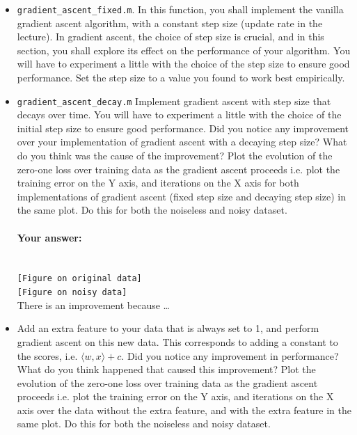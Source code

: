 \documentclass[english]{article}
\begin{document}
\begin{itemize}
\item {\tt gradient\_ascent\_fixed.m}. In this function, you shall implement the vanilla gradient ascent algorithm, with a constant step size (update rate in the lecture). In gradient ascent, the choice of step size is crucial, and in this section, you shall explore its effect on the performance of your algorithm. You will have to experiment a little with the choice of the step size to ensure good performance. Set the step size to a value you found to work best empirically. 

\item {\tt gradient\_ascent\_decay.m} Implement gradient ascent with step size that decays over time. You will have to experiment a little with the choice of the initial step size to ensure good performance. Did you notice any improvement over your implementation of gradient ascent with a decaying step size? What do you think was the cause of the improvement? Plot the evolution of the zero-one loss over training data as the gradient ascent proceeds i.e. plot the training error on the Y axis, and iterations on the X axis for both implementations of gradient ascent (fixed step size and decaying step size) in the same plot. Do this for both the noiseless and noisy dataset.

\paragraph{Your answer:}
 ~\\
 
 {\tt  [Figure on original data]}
 \\    
 
 {\tt [Figure on noisy data]}
 \\
  
  There is an improvement because \ldots  
  \\

\item Add an extra feature to your data that is always set to 1, and perform gradient ascent on this new data. This corresponds to adding a constant to the scores, i.e. $\langle w,x\rangle + c$. Did you notice any improvement in performance? What do you think happened that caused this improvement? Plot the evolution of the zero-one loss over training data as the gradient ascent proceeds i.e. plot the training error on the Y axis, and iterations on the X axis over the data without the extra feature, and with the extra feature in the same plot. Do this for both the noiseless and noisy dataset.


\end{itemize}
\end{document}
